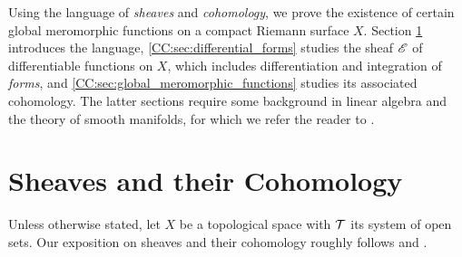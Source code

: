 \documentclass[../Moduli_Spaces_of_Riemann_Surfaces.tex]{subfiles}
\begin{document}
    Using the language of \textit{sheaves} and \textit{cohomology}, we prove the existence of certain global meromorphic functions on a compact Riemann surface $X$. Section \ref{CC:sec:sheaves} introduces the language, \ref{CC:sec:differential_forms} studies the sheaf $\mathscr{E}$ of differentiable functions on $X$, which includes differentiation and integration of \textit{forms}, and \ref{CC:sec:global_meromorphic_functions} studies its associated cohomology. The latter sections require some background in linear algebra and the theory of smooth manifolds, for which we refer the reader to \cite{leeSM}.
    \section{Sheaves and their Cohomology}\label{CC:sec:sheaves}
    Unless otherwise stated, let $X$ be a topological space with $\mathcal{T}$ its system of open sets. Our exposition on sheaves and their cohomology roughly follows \cite[][Sections 6 \& 12]{forster} and \cite[][Chapter IX]{miranda}.
\end{document}
